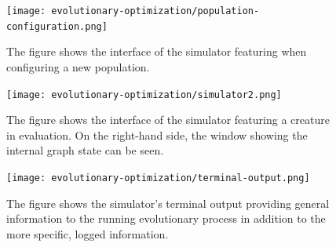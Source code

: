 \documentclass[main]{subfiles}
\begin{document}
\begin{figure}[H]
\centering
\hspace*{-6em}
\texttt{[image: evolutionary-optimization/population-configuration.png]}
\caption[The simulator population configuration interface]{The figure shows the interface of the simulator featuring when configuring a new population.}
\label{figure:simulator-population-config}
\end{figure}

\begin{figure}[H]
\centering
\hspace*{-6em}
\texttt{[image: evolutionary-optimization/simulator2.png]}
\caption[The simulator evolution interface]{The figure shows the interface of the simulator featuring a creature in evaluation. On the right-hand side, the window showing the internal graph state can be seen.}
\label{figure:simulator}
\end{figure}

\begin{figure}[H]
\centering
\texttt{[image: evolutionary-optimization/terminal-output.png]}
\caption[The simulator terminal output]{The figure shows the simulator's terminal output providing general information to the running evolutionary process in addition to the more specific, logged information.}
\label{figure:simulator-terminal}
\end{figure}
\end{document}
